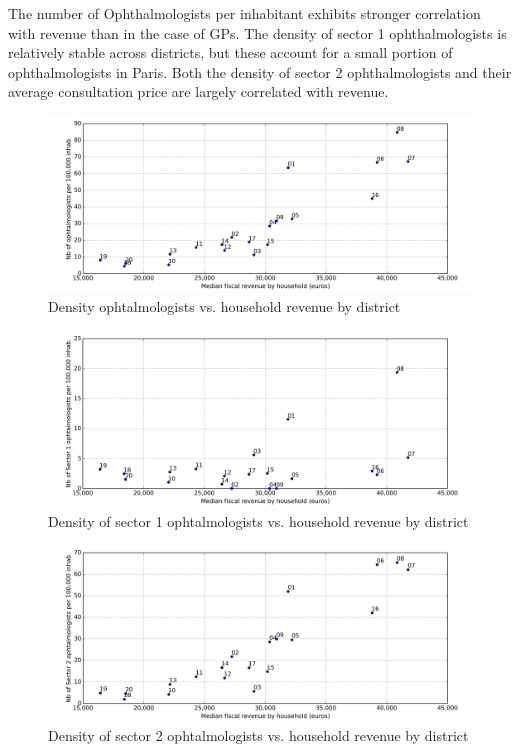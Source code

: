 \documentclass[11pt]{article}
\begin{document}
The number of Ophthalmologists per inhabitant exhibits stronger correlation with revenue than in the case of GPs. The density of sector 1 ophthalmologists is relatively stable across districts, but these account for a small portion of ophthalmologists in Paris. Both the density of sector 2 ophthalmologists and their average consultation price are largely correlated with revenue.

\begin{figure}[H]
    \caption{Density ophtalmologists vs. household revenue by district}
	\centering
		\includegraphics[width=16cm]{images/Ophtalmo_Ardt_DensityVsRevenue.png}
\end{figure}

\begin{figure}[H]
    \caption{Density of sector 1 ophtalmologists vs. household revenue by district}
	\centering
		\includegraphics[width=16cm]{images/Ophtalmo_Ardt_DensityS1VsRevenue.png}
\end{figure}


\begin{figure}[H]
    \caption{Density of sector 2 ophtalmologists vs. household revenue by district}
	\centering
		\includegraphics[width=16cm]{images/Ophtalmo_Ardt_DensityS2VsRevenue.png}
\end{figure}
\end{document}
